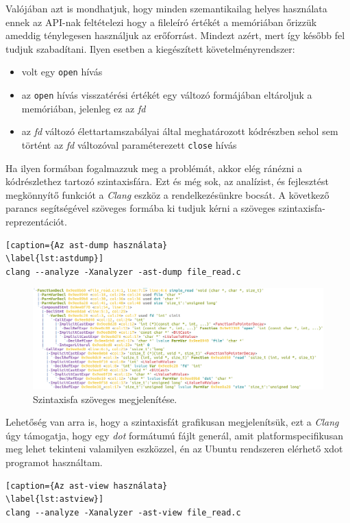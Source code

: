\documentclass[a4paper,12pt]{report}
\begin{document}
Valójában azt is mondhatjuk, hogy minden szemantikailag helyes használata ennek az API-nak feltételezi hogy a fileleíró értékét a memóriában őrizzük ameddig ténylegesen használjuk az erőforrást. Mindezt azért, mert így később fel tudjuk szabadítani. Ilyen esetben a kiegészített követelményrendszer:
\begin{itemize}
\item volt egy \texttt{open} hívás
\item az \texttt{open} hívás visszatérési értékét egy változó formájában eltároljuk a memóriában, jelenleg ez az \emph{fd}
\item az \emph{fd} változó élettartamszabályai által meghatározott kódrészben sehol sem történt az \emph{fd} változóval paraméterezett \texttt{close} hívás
\end{itemize}
Ha ilyen formában fogalmazzuk meg a problémát, akkor elég ránézni a kódrészlethez tartozó szintaxisfára. Ezt és még sok, az analízist, és fejlesztést megkönnyítő funkciót a \emph{Clang} eszköz a rendelkezésünkre bocsát. A következő parancs segítségével szöveges formába ki tudjuk kérni a szöveges szintaxisfa-reprezentációt.
\begin{lstlisting}[caption={Az ast-dump használata}
\label{lst:astdump}]
clang --analyze -Xanalyzer -ast-dump file_read.c
\end{lstlisting}

\begin{figure}[h]
\centering
\includegraphics[scale=0.27]{astdumptomorrow.png}
\caption{Szintaxisfa szöveges megjelenítése.}
\end{figure}

Lehetőség van arra is, hogy a szintaxisfát grafikusan megjelenítsük, ezt a \emph{Clang} úgy támogatja, hogy egy \emph{dot} formátumú fájlt generál, amit platformspecifikusan meg lehet tekinteni valamilyen eszközzel, én az Ubuntu rendszeren elérhető xdot programot használtam.
\begin{lstlisting}[caption={Az ast-view használata}
\label{lst:astview}]
clang --analyze -Xanalyzer -ast-view file_read.c
\end{lstlisting}
\end{document}

